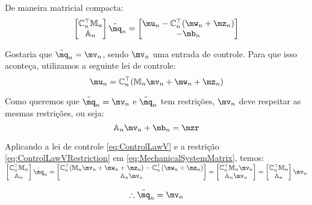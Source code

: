 De maneira matricial compacta:
\begin{equation} \label{eq:MechanicalSystemMatrix}
\begin{bmatrix}
\mC_n^\top \mM_n \\
\mA_n
\end{bmatrix}
\ddot{\mq}_n
=
\begin{bmatrix}
\mu_n - \mC_n^\top(\mw_n + \mz_n) \\
-\mb_n
\end{bmatrix}
\end{equation}

Gostaria que $ \ddot{\mq}_n = \mv_n $, sendo $\mv_n$ uma entrada de controle. Para que isso aconte\c{c}a, utilizamos a seguinte lei de controle:
\begin{equation} \label{eq:ControlLawV}
\mu_n = \mC_n^\top ( \mM_n \mv_n + \mw_n + \mz_n )
\end{equation}

Como queremos que $ \ddot{\mq}_n = \mv_n $ e $\ddot{\mq}_n$ tem restri\c{c}\~oes, $\mv_n$ deve respeitar as mesmas restri\c{c}\~oes, ou seja:
\begin{equation} \label{eq:ControlLawVRestriction}
\mA_n \mv_n + \mb_n = \mzr
\end{equation}

Aplicando a lei de controle \eqref{eq:ControlLawV} e a restri\c{c}\~ao \eqref{eq:ControlLawVRestriction} em \eqref{eq:MechanicalSystemMatrix}, temos: \\

$ \begin{bmatrix}
\mC_n^\top \mM_n \\
\mA_n
\end{bmatrix}
\ddot{\mq}_n
=
\begin{bmatrix}
\mC_n^\top ( \mM_n \mv_n + \mw_n + \mz_n ) - \mC_n^\top(\mw_n + \mz_n) \\
\mA_n \mv_n
\end{bmatrix}
=
\begin{bmatrix}
\mC_n^\top  \mM_n \mv_n \\
\mA_n \mv_n
\end{bmatrix}
=
\begin{bmatrix}
\mC_n^\top \mM_n \\
\mA_n
\end{bmatrix}
\mv_n $

\begin{equation} \label{eq:ClosedLoopV}
\therefore \ddot{\mq}_n = \mv_n
\end{equation}

